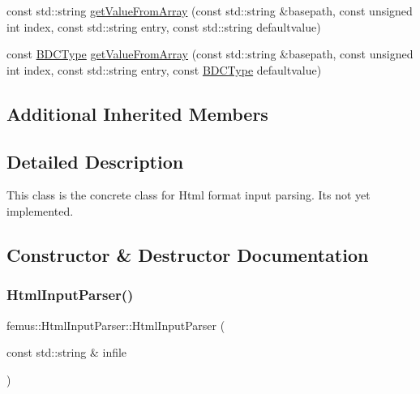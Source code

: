 \begin{DoxyCompactItemize}
\item 
const std\+::string \mbox{\hyperlink{classfemus_1_1_html_input_parser_a6ea19a89092720479eadfb46d38e5b7a}{get\+Value\+From\+Array}} (const std\+::string \&basepath, const unsigned int index, const std\+::string entry, const std\+::string defaultvalue)
\item 
const \mbox{\hyperlink{_b_d_c_type_enum_8hpp_ac1efcf28f6f152fe5354b888f616668d}{B\+D\+C\+Type}} \mbox{\hyperlink{classfemus_1_1_html_input_parser_a243d191b91055db6ab63123774360377}{get\+Value\+From\+Array}} (const std\+::string \&basepath, const unsigned int index, const std\+::string entry, const \mbox{\hyperlink{_b_d_c_type_enum_8hpp_ac1efcf28f6f152fe5354b888f616668d}{B\+D\+C\+Type}} defaultvalue)
\end{DoxyCompactItemize}
\subsection*{Additional Inherited Members}


\subsection{Detailed Description}
This class is the concrete class for Html format input parsing. It\textquotesingle{}s not yet implemented. 

\subsection{Constructor \& Destructor Documentation}
\mbox{\label{classfemus_1_1_html_input_parser_a54c0e5a9bc28af9bb1b6a8a8500871d4}} 
\subsubsection{\texorpdfstring{Html\+Input\+Parser()}{HtmlInputParser()}}
{\footnotesize\ttfamily femus\+::\+Html\+Input\+Parser\+::\+Html\+Input\+Parser (\begin{DoxyParamCaption}\item[{const std\+::string \&}]{infile }\end{DoxyParamCaption})\hspace{0.3cm}{\ttfamily [inline]}}


